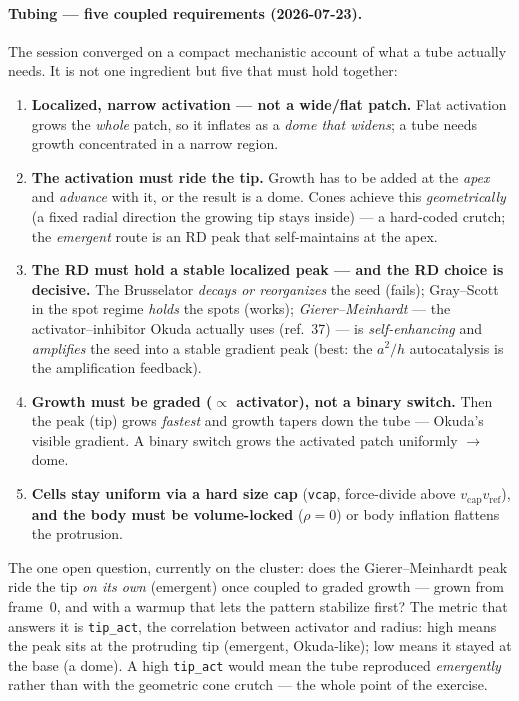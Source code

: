 \documentclass[11pt]{article}
\begin{document}
\paragraph{Tubing --- five coupled requirements (2026-07-23).} The session converged on a compact
mechanistic account of what a tube actually needs. It is not one ingredient but five that must hold
together:
\begin{enumerate}\itemsep2pt
\item \textbf{Localized, narrow activation --- not a wide/flat patch.} Flat activation grows the
\emph{whole} patch, so it inflates as a \emph{dome that widens}; a tube needs growth concentrated in a
narrow region.
\item \textbf{The activation must ride the tip.} Growth has to be added at the \emph{apex} and
\emph{advance} with it, or the result is a dome. Cones achieve this \emph{geometrically} (a fixed radial
direction the growing tip stays inside) --- a hard-coded crutch; the \emph{emergent} route is an RD peak
that self-maintains at the apex.
\item \textbf{The RD must hold a stable localized peak --- and the RD choice is decisive.} The
Brusselator \emph{decays or reorganizes} the seed (fails); Gray--Scott in the spot regime \emph{holds} the
spots (works); \emph{Gierer--Meinhardt} --- the activator--inhibitor Okuda actually uses (ref.~37) --- is
\emph{self-enhancing} and \emph{amplifies} the seed into a stable gradient peak (best: the $a^2/h$
autocatalysis is the amplification feedback).
\item \textbf{Growth must be graded ($\propto$ activator), not a binary switch.} Then the peak (tip)
grows \emph{fastest} and growth tapers down the tube --- Okuda's visible gradient. A binary switch grows
the activated patch uniformly $\to$ dome.
\item \textbf{Cells stay uniform via a hard size cap} (\texttt{vcap}, force-divide above
$v_{\mathrm{cap}}v_{\mathrm{ref}}$), \textbf{and the body must be volume-locked} ($\rho\!=\!0$) or body
inflation flattens the protrusion.
\end{enumerate}
The one open question, currently on the cluster: does the Gierer--Meinhardt peak ride the tip \emph{on its
own} (emergent) once coupled to graded growth --- grown from frame~0, and with a warmup that lets the
pattern stabilize first? The metric that answers it is \texttt{tip\_act}, the correlation between activator
and radius: high means the peak sits at the protruding tip (emergent, Okuda-like); low means it stayed at
the base (a dome). A high \texttt{tip\_act} would mean the tube reproduced \emph{emergently} rather than
with the geometric cone crutch --- the whole point of the exercise.
\end{document}

